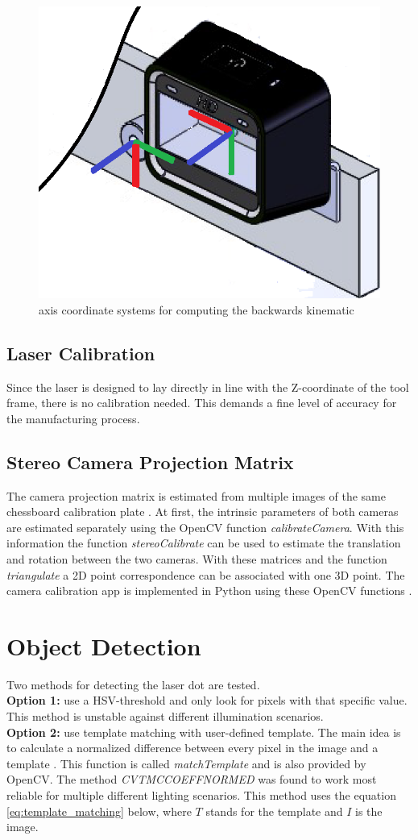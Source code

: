 \documentclass[11pt,twoside,twocolumn,a4paper]{article}
\begin{document}
\begin{figure}[h]
	\centering
	\includegraphics[width=0.3\columnwidth]{images/hand_eye_coord_2.png}
	\caption{axis coordinate systems for computing the backwards kinematic}
	\label{fig:hand_eye_coord}
\end{figure}

\subsection{Laser Calibration}
Since the laser is designed to lay directly in line with the Z-coordinate of the tool frame, there is no calibration needed. This demands a fine level of accuracy for the manufacturing process. 

\subsection{Stereo Camera Projection Matrix}

The camera projection matrix is estimated from multiple images of the same chessboard calibration plate \cite[p. 178-182]{Ziss2008}. At first, the intrinsic parameters of both cameras are estimated separately using the OpenCV function \textit{calibrateCamera}. With this information the function \textit{stereoCalibrate} can be used to estimate the translation and rotation between the two cameras. With these matrices and the function \textit{triangulate} a 2D point correspondence can be associated with one 3D point. The camera calibration app is implemented in Python using these OpenCV functions \cite{2014opencv}. 



\section{Object Detection}
Two methods for detecting the laser dot are tested.  \\
\textbf{Option 1:} use a HSV-threshold and only look for pixels with that specific value. This method is unstable against different illumination scenarios. \\
\textbf{Option 2:} use template matching with user-defined template. The main idea is to calculate a normalized difference between every pixel in the image and a template \cite[p. 1061-1062]{Gonz2018}. This function is called \textit{matchTemplate} and is also provided by OpenCV. The method \textit{CV\textunderscore TM\textunderscore CCOEFF\textunderscore NORMED} was found to work most reliable for multiple different lighting scenarios. This method uses the equation \ref{eq:template_matching} below, where $T$ stands for the template and $I$ is the image. 
\end{document}
